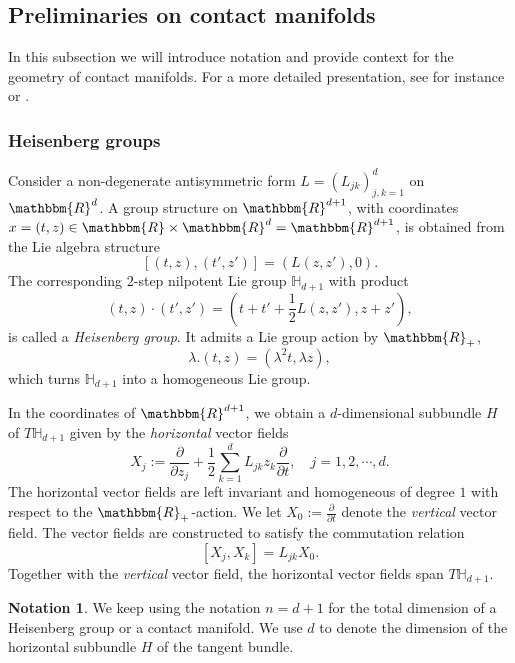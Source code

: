 \documentclass[10pt]{amsart}
\theoremstyle{remark}
\theoremstyle{definition}
\newtheorem*{notation}{Notation}
\begin{document}
\subsection{Preliminaries on contact manifolds}
\label{contactprelims}

In this subsection we will introduce notation and provide context for the geometry of contact manifolds. For a more detailed presentation, see for instance \cite{bella96,cadapaaaow} or \cite[Chapter 2]{pongemono}. 

\subsubsection{Heisenberg groups} 
Consider a non-degenerate antisymmetric form $L=(L_{jk})_{j,k=1}^d$ on ${\mathbbm{R}}^d$. A group structure on ${\mathbbm{R}}^{d+1}$, with coordinates $x=(t,z)\in {\mathbbm{R}}\times {\mathbbm{R}}^d= {\mathbbm{R}}^{d+1}$, is obtained from the Lie algebra structure
\[[(t,z),(t',z')]=(L(z,z'),0).\] The corresponding $2$-step nilpotent Lie group $\mathbb{H}_{d+1}$ with product
\[(t,z)\cdot (t',z')=\left(t+t'+\frac{1}{2}L(z,z'),z+z'\right),\]
is called a \emph{Heisenberg group}.
It admits a Lie group action by ${\mathbbm{R}}_+$, 
\begin{equation}
\label{actionr}
\lambda.(t,z)=(\lambda^2t,\lambda z),
\end{equation}
which turns $\mathbb{H}_{d+1}$  into a homogeneous Lie group. 

In the coordinates of ${\mathbbm{R}}^{d+1}$, we obtain a $d$-dimensional subbundle $H$ of $T \mathbb{H}_{d+1}$ given by the \emph{horizontal} vector fields
\begin{equation}
\label{leftinvariantframe} X_j:=\frac{\partial}{\partial z_j}+\frac{1}{2}\sum_{k=1}^d L_{jk}z_k\frac{\partial}{\partial t}, \quad j=1,2,\cdots, d.
\end{equation}
The horizontal vector fields are left invariant and homogeneous of degree $1$ with respect to the ${\mathbbm{R}}_+$-action. We let $X_0:=\frac{\partial}{\partial t}$ denote the \emph{vertical} vector field. The vector fields are constructed to satisfy the commutation relation
\[[X_j,X_k]=L_{jk}X_0.\]
Together with the \emph{vertical} vector field, the horizontal vector fields span $T\mathbb{H}_{d+1}$. 

\begin{notation}
We keep using the notation $n=d+1$ for the total dimension of a Heisenberg group or a contact manifold. We use $d$ to denote the dimension of the horizontal subbundle $H$ of the tangent bundle.
\end{notation}
\end{document}
